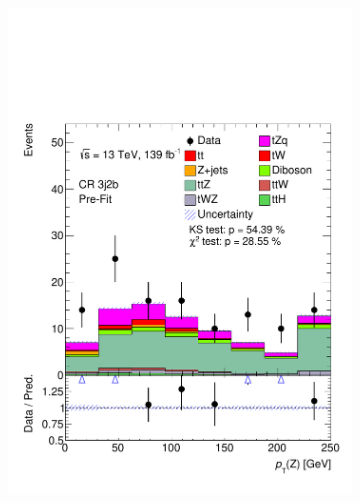 \vspace*{-0.3cm}
\begin{figure}[h!] 
  \begin{subfigure}[b]{0.32\linewidth}
    \centering
    \includegraphics[width=\linewidth]{ubonn-thesis/Chapters/Chapters_05/Figure/CR_ttZ/CR_3j2b_Z_pt.pdf} 
  \end{subfigure}%
  \begin{subfigure}[b]{0.32\linewidth}
    \centering

\end{subfigure}
\end{figure}
